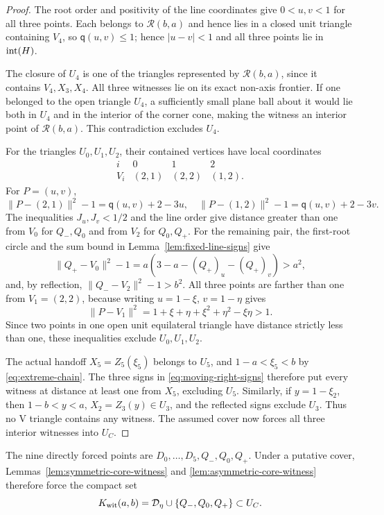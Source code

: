 \begin{proof}
The root order and positivity of the line coordinates give
$0<u,v<1$ for all three points.  Each belongs to $\mathcal R(b,a)$ and hence
lies in a closed unit triangle containing $V_4$, so
$\mathsf q(u,v)\le1$; hence
$|u-v|<1$ and all three points lie in $\mathrm{int}(H)$.

The closure of $U_4$ is one of the triangles represented by
$\mathcal R(b,a)$, since it contains $V_4,X_3,X_4$.  All three witnesses lie
on its exact non-axis frontier.  If one belonged to the open triangle $U_4$,
a sufficiently small plane ball about it would lie both in $U_4$ and in the
interior of the corner cone, making the witness an interior point of
$\mathcal R(b,a)$.  This contradiction excludes $U_4$.

For the triangles $U_0,U_1,U_2$, their contained vertices have local coordinates
\[
 \begin{array}{c|ccc}
 i&0&1&2\\ \hline
 V_i&(2,1)&(2,2)&(1,2).
 \end{array}
\]
For $P=(u,v)$,
\[
 \lVert P-(2,1)\rVert^2-1=\mathsf q(u,v)+2-3u,
 \quad
 \lVert P-(1,2)\rVert^2-1=\mathsf q(u,v)+2-3v.
\]
The inequalities $J_u,J_v<1/2$ and the line order give distance greater than
one from $V_0$ for $Q_-,Q_0$ and from $V_2$ for $Q_0,Q_+$.  For the remaining
pair, the first-root circle and the sum bound in
Lemma~\ref{lem:fixed-line-signs} give
\[
 \lVert Q_+-V_0\rVert^2-1
 =a(3-a-(Q_+)_u-(Q_+)_v)>a^2,
\]
and, by reflection, $\lVert Q_--V_2\rVert^2-1>b^2$.  All three points are
farther than one from $V_1=(2,2)$, because writing $u=1-\xi$, $v=1-\eta$
gives
\[
 \lVert P-V_1\rVert^2
 =1+\xi+\eta+\xi^2+\eta^2-\xi\eta>1.
\]
Since two points in one open unit equilateral triangle have distance strictly
less than one, these inequalities exclude $U_0,U_1,U_2$.

The actual handoff $X_5=Z_5(\xi_5)$ belongs to $U_5$, and
$1-a<\xi_5<b$ by \eqref{eq:extreme-chain}.  The three signs in
\eqref{eq:moving-right-signs} therefore put every witness at distance at
least one from $X_5$, excluding $U_5$.  Similarly, if $y=1-\xi_2$, then
$1-b<y<a$, $X_2=Z_3(y)\in U_3$, and the reflected signs exclude $U_3$.
Thus no V triangle contains any witness.  The assumed cover now forces all
three interior witnesses into $U_C$.
\end{proof}

The nine directly forced points are
$D_0,\ldots,D_5,Q_-,Q_0,Q_+$.  Under a putative cover,
Lemmas~\ref{lem:symmetric-core-witness} and
\ref{lem:asymmetric-core-witness} therefore force the compact set
\begin{equation}
 K_{\rm wit}(a,b)=
 \mathcal D_\eta\cup\{Q_-,Q_0,Q_+\}
 \subset U_C.                                    \label{eq:forced-witness-set}
\end{equation}

